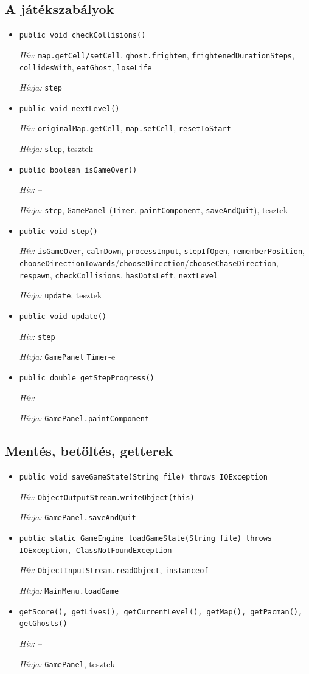 \documentclass[10pt, a4paper]{article}
\newcommand{\fn}[3]{%
  \item \texttt{#1}\par
  {\small\textit{Hív:} #2\par\textit{Hívja:} #3}\vspace{3pt}}
\newcommand{\none}{--}
\begin{document}
\subsection*{A játékszabályok}
\begin{itemize}
\fn{public void checkCollisions()}{\texttt{map.getCell/setCell}, \texttt{ghost.frighten}, \texttt{frightenedDurationSteps}, \texttt{collidesWith}, \texttt{eatGhost}, \texttt{loseLife}}{\texttt{step}}
\fn{public void nextLevel()}{\texttt{originalMap.getCell}, \texttt{map.setCell}, \texttt{resetToStart}}{\texttt{step}, tesztek}
\fn{public boolean isGameOver()}{\none}{\texttt{step}, \texttt{GamePanel} (\texttt{Timer}, \texttt{paintComponent}, \texttt{saveAndQuit}), tesztek}
\fn{public void step()}{\texttt{isGameOver}, \texttt{calmDown}, \texttt{processInput}, \texttt{stepIfOpen}, \texttt{rememberPosition}, \texttt{chooseDirectionTowards}/\texttt{chooseDirection}/\texttt{chooseChaseDirection}, \texttt{respawn}, \texttt{checkCollisions}, \texttt{hasDotsLeft}, \texttt{nextLevel}}{\texttt{update}, tesztek}
\fn{public void update()}{\texttt{step}}{\texttt{GamePanel} \texttt{Timer}-e}
\fn{public double getStepProgress()}{\none}{\texttt{GamePanel.paintComponent}}
\end{itemize}
\subsection*{Mentés, betöltés, getterek}
\begin{itemize}
\fn{public void saveGameState(String file) throws IOException}{\texttt{ObjectOutputStream.writeObject(this)}}{\texttt{GamePanel.saveAndQuit}}
\fn{public static GameEngine loadGameState(String file) throws IOException, ClassNotFoundException}{\texttt{ObjectInputStream.readObject}, \texttt{instanceof}}{\texttt{MainMenu.loadGame}}
\fn{getScore(), getLives(), getCurrentLevel(), getMap(), getPacman(), getGhosts()}{\none}{\texttt{GamePanel}, tesztek}
\end{itemize}

\end{document}
